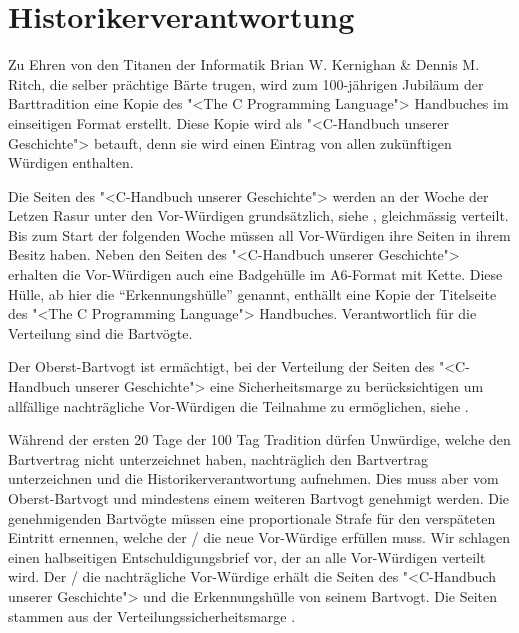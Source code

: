 \documentclass[fontsize=12pt,parskip=half]{scrartcl}
\begin{document}
\section{Historikerverantwortung}
\begin{contract}

  \Clause[title={"<C-Handbuch unserer Geschichte">}]
  Zu Ehren von den Titanen der Informatik Brian W. Kernighan \& Dennis M. Ritch, die selber prächtige Bärte trugen,
  wird zum 100-jährigen Jubiläum der Barttradition eine Kopie des "<The C Programming Language"> Handbuches im
  einseitigen Format erstellt. Diese Kopie wird als "<C-Handbuch unserer Geschichte"> betauft, denn sie wird einen
  Eintrag von allen zukünftigen Würdigen enthalten.

  \Clause[title={Verteilung}]
  Die Seiten des "<C-Handbuch unserer Geschichte"> werden an der Woche der Letzen Rasur unter den Vor-Würdigen grundsätzlich, siehe , gleichmässig verteilt.
  Bis zum Start der folgenden Woche müssen all Vor-Würdigen ihre Seiten in ihrem Besitz haben.
  Neben den Seiten des "<C-Handbuch unserer Geschichte">
  erhalten die Vor-Würdigen auch eine Badgehülle im A6-Format mit Kette. Diese Hülle, ab hier die ``Erkennungshülle'' genannt, enthällt eine Kopie der
  Titelseite des "<The C Programming Language"> Handbuches. Verantwortlich für die Verteilung sind die Bartvögte.

  \SubClause[title={Verteilungssicherheitsmarge}]\label{H.verteilungsmarge}
  Der Oberst-Bartvogt ist ermächtigt, bei der Verteilung der Seiten des "<C-Handbuch unserer Geschichte"> eine Sicherheitsmarge zu berücksichtigen um allfällige nachträgliche Vor-Würdigen
  die Teilnahme zu ermöglichen, siehe .

  \Clause[title={Nachträgliche Vor-Würdige}]\label{H.nachzug}
  Während der ersten 20 Tage der 100 Tag Tradition dürfen Unwürdige, welche den Bartvertrag nicht unterzeichnet haben, nachträglich den Bartvertrag unterzeichnen und die Historikerverantwortung
  aufnehmen. Dies muss aber vom Oberst-Bartvogt und mindestens einem weiteren Bartvogt genehmigt werden. Die genehmigenden Bartvögte müssen eine proportionale Strafe für den verspäteten Eintritt ernennen,
  welche der / die neue Vor-Würdige erfüllen muss. Wir schlagen einen halbseitigen Entschuldigungsbrief vor, der an alle Vor-Würdigen verteilt wird. Der / die nachträgliche Vor-Würdige erhält die Seiten des "<C-Handbuch unserer Geschichte">
  und die Erkennungshülle von seinem Bartvogt. Die Seiten stammen aus der Verteilungssicherheitsmarge .


\end{contract}
\end{document}
